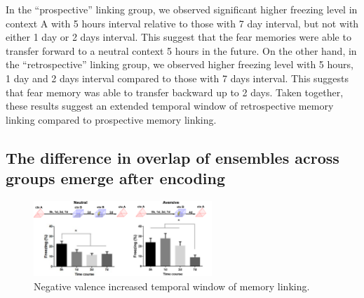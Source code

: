 \documentclass[master.tex]{subfiles}
\begin{document}
In the ``prospective'' linking group, we observed significant higher freezing
level in context A with 5 hours interval relative to those with 7 day interval,
but not with either 1 day or 2 days interval. This suggest that the fear
memories were able to transfer forward to a neutral context 5 hours in the
future. On the other hand, in the ``retrospective'' linking group, we observed
higher freezing level with 5 hours, 1 day and 2 days interval compared to those
with 7 days interval. This suggests that fear memory was able to transfer
backward up to 2 days. Taken together, these results suggest an extended
temporal window of retrospective memory linking compared to prospective memory
linking.

\subsection*{The difference in overlap of ensembles across groups emerge after
  encoding}

\begin{figure}
  \centering \includegraphics[width =
  0.6\textwidth]{Figures/val_retro_prelim.pdf}
  \caption{\footnotesize Negative valence increased temporal window of memory
    linking.}
  \label{fig:prelim_val}
\end{figure}
\end{document}
